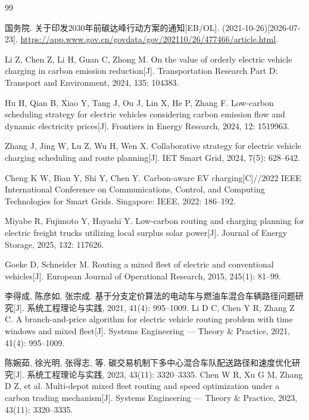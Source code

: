 \documentclass{setp-new}
\begin{document}
\begin{thebibliography}{99}

 国务院. 关于印发2030年前碳达峰行动方案的通知[EB/OL]. (2021-10-26)[2026-07-23].
\url{https://app.www.gov.cn/govdata/gov/202110/26/477466/article.html}.

 Li Z, Chen Z, Li H, Guan C, Zhong M. On the value of orderly electric vehicle charging in carbon emission reduction[J]. Transportation Research Part D: Transport and Environment, 2024, 135: 104383.

 Hu H, Qian B, Xiao Y, Tang J, Ou J, Lin X, He P, Zhang F. Low-carbon scheduling strategy for electric vehicles considering carbon emission flow and dynamic electricity prices[J]. Frontiers in Energy Research, 2024, 12: 1519963.

 Zhang J, Jing W, Lu Z, Wu H, Wen X. Collaborative strategy for electric vehicle charging scheduling and route planning[J]. IET Smart Grid, 2024, 7(5): 628--642.

 Cheng K W, Bian Y, Shi Y, Chen Y. Carbon-aware EV charging[C]//2022 IEEE International Conference on Communications, Control, and Computing Technologies for Smart Grids. Singapore: IEEE, 2022: 186--192.

 Miyabe R, Fujimoto Y, Hayashi Y. Low-carbon routing and charging planning for electric freight trucks utilizing local surplus solar power[J]. Journal of Energy Storage, 2025, 132: 117626.

 Goeke D, Schneider M. Routing a mixed fleet of electric and conventional vehicles[J]. European Journal of Operational Research, 2015, 245(1): 81--99.

 李得成, 陈彦如, 张宗成. 基于分支定价算法的电动车与燃油车混合车辆路径问题研究[J]. 系统工程理论与实践, 2021, 41(4): 995--1009.\newline
Li D C, Chen Y R, Zhang Z C. A branch-and-price algorithm for electric vehicle routing problem with time windows and mixed fleet[J]. Systems Engineering --- Theory \& Practice, 2021, 41(4): 995--1009.

 陈婉茹, 徐光明, 张得志, 等. 碳交易机制下多中心混合车队配送路径和速度优化研究[J]. 系统工程理论与实践, 2023, 43(11): 3320--3335.\newline
Chen W R, Xu G M, Zhang D Z, et al. Multi-depot mixed fleet routing and speed optimization under a carbon trading mechanism[J]. Systems Engineering --- Theory \& Practice, 2023, 43(11): 3320--3335.


\end{thebibliography}
\end{document}
